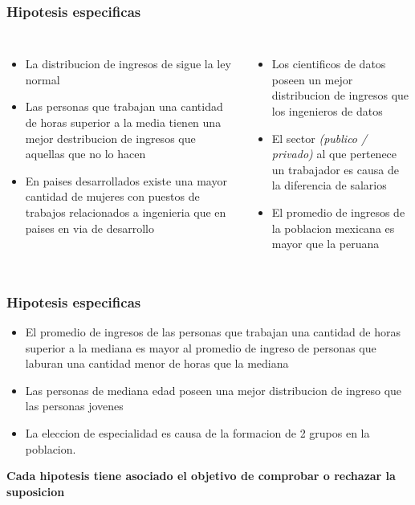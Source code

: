 \documentclass{beamer}
\begin{document}
\begin{frame}
\frametitle{Hipotesis especificas}

\begin{columns}

  \begin{itemize}
      \item La distribucion de ingresos de  sigue
        la ley normal
      \item Las personas que trabajan una cantidad de horas superior a
        la media tienen una mejor destribucion de ingresos que aquellas
        que no lo hacen
      \item En paises desarrollados existe una mayor cantidad
        de mujeres con puestos de trabajos relacionados a ingenieria que en paises en via
        de desarrollo
  \end{itemize}


  \begin{itemize}
      \item Los cientificos de datos poseen un mejor distribucion de ingresos
        que los ingenieros de datos
      \item El sector \textit{(publico / privado)} al que pertenece un trabajador
        es causa de la diferencia de salarios
      \item El promedio de ingresos de la poblacion mexicana es mayor
        que la peruana
  \end{itemize}
\end{columns}
\end{frame}


\begin{frame}
\frametitle{Hipotesis especificas}
  \begin{itemize}
      \item El \alert{promedio de ingresos} de las personas que trabajan
        una cantidad de horas superior a la mediana es mayor al promedio
        de ingreso de personas que laburan una cantidad menor de horas
        que la mediana
      \item Las personas de mediana edad poseen una mejor distribucion
        de ingreso que las personas jovenes
      \item La eleccion de especialidad es causa de la formacion de 2 grupos
        en la poblacion.
  \end{itemize}

  \textbf{Cada hipotesis tiene asociado el objetivo de comprobar
  o rechazar la suposicion}

\end{frame}
\end{document}
